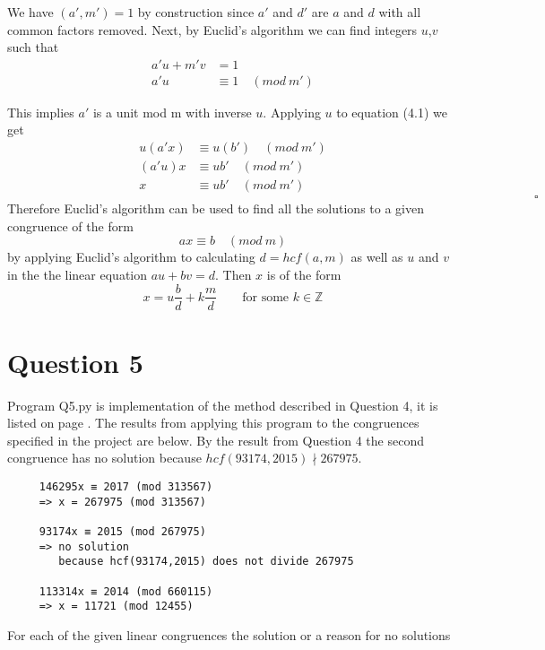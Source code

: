 \documentclass[a4paper]{article}
\newcommand{\m}{(mod \ m)}
\newcommand{\mm}{(mod \ m')}
\begin{document}
We have $(a',m')=1$ by construction since $a'$ and $d'$ are $a$ and $d$ with all common factors removed. Next, by Euclid's algorithm we can find integers $u$,$v$ such that
\begin{align*}
a'u + m'v &= 1 \\
a'u &\equiv 1 \quad \mm
\end{align*}

This implies $a'$ is a unit mod m with inverse $u$. Applying $u$ to equation (4.1) we get
\begin{align*}
u(a'x) &\equiv u(b') \quad \mm \\
(a'u)x &\equiv ub' \quad \mm \\
x &\equiv ub' \quad \mm
\end{align*} $\qquad\qquad\qquad\qquad\qquad\qquad\qquad\qquad\qquad\qquad\qquad\qquad\qquad\qquad\qquad\qquad\qquad\qquad\qquad\qquad\qquad \square$
\bigbreak
Therefore Euclid's algorithm can be used to find all the solutions to a given congruence of the form
\[ ax \equiv b \quad \m \]
by applying Euclid's algorithm to calculating $d=hcf(a,m)$ as well as $u$ and $v$ in the the linear equation $au+bv=d$. Then $x$ is of the form
\[ x = u\frac{b}{d} + k\frac{m}{d} \qquad \text{for some $k\in\mathbb{Z}$}\]

\section*{Question 5}
Program Q5.py is implementation of the method described in Question 4, it is listed on page \pageref{PQ5}. The results from applying this program to the congruences specified in the project are below. By the result from Question 4 the second congruence has no solution because $hcf(93174,2015)\nmid267975$.
\begin{table}[H]
\centering
\begin{verbatim}
     146295x ≡ 2017 (mod 313567)
     => x = 267975 (mod 313567) 
     
     93174x ≡ 2015 (mod 267975)
     => no solution 
        because hcf(93174,2015) does not divide 267975 
     
     113314x ≡ 2014 (mod 660115)
     => x = 11721 (mod 12455) 
\end{verbatim}
\caption{For each of the given linear congruences the solution or a reason for no solutions}
\end{table}
\end{document}
